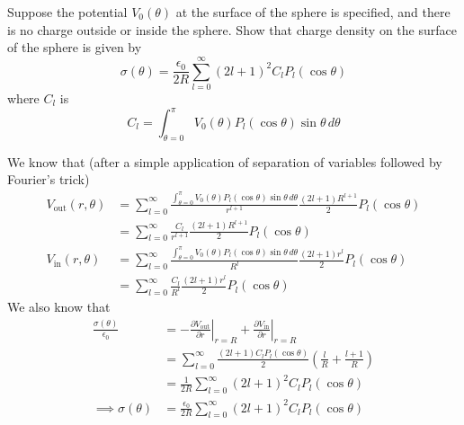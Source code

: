 \documentclass[../main.tex]{subfiles}
\begin{document}
\begin{questions}
	\question Suppose the potential $V_0(\theta)$ at the surface of the sphere is specified, and there is no charge outside or inside the sphere. Show that charge density on the surface of the sphere is given by
	\begin{equation*}
		\sigma(\theta) = \frac{\epsilon_0}{2R}\sum_{l=0}^{\infty} (2l+1)^2 C_l P_l(\cos\theta)
	\end{equation*}
	where $C_l$ is
	\begin{equation*}
		C_l = \int_{\theta=0}^{\pi} V_0(\theta)P_l(\cos\theta)\sin\theta\,d\theta
	\end{equation*}
	\begin{solution}
		We know that (after a simple application of separation of variables followed by Fourier's trick)
		\begin{align}
			V_\text{out}(r,\theta) &= \sum_{l=0}^{\infty} \frac{\int_{\theta=0}^{\pi}V_0(\theta)P_l(\cos\theta)\sin\theta\,d\theta}{r^{l+1}}\frac{(2l+1)R^{l+1}}{2}P_l(\cos\theta)\\
			&=  \sum_{l=0}^{\infty} \frac{C_l}{r^{l+1}}\frac{(2l+1)R^{l+1}}{2}P_l(\cos\theta)\\
			V_\text{in}(r,\theta) &= \sum_{l=0}^{\infty} \frac{\int_{\theta=0}^{\pi}V_0(\theta)P_l(\cos\theta)\sin\theta\,d\theta}{R^l}\frac{(2l+1)r^l}{2}P_l(\cos\theta)\\
			&= \sum_{l=0}^{\infty} \frac{C_l}{R^l}\frac{(2l+1)r^l}{2}P_l(\cos\theta)
		\end{align}
		We also know that
		\begin{align}
			\frac{\sigma(\theta)}{\epsilon_0} &= \left.-\frac{\partial V_\text{out}}{\partial r}\right|_{r=R} + \left.\frac{\partial V_\text{in}}{\partial r}\right|_{r=R}\\
			&= \sum_{l=0}^{\infty} \frac{(2l+1)C_lP_l(\cos\theta)}{2}\left(\frac{l}{R}+\frac{l+1}{R}\right)\\
			&= \frac{1}{2R}\sum_{l=0}^{\infty} (2l+1)^2 C_l P_l(\cos\theta)\\
			\implies \sigma(\theta) &= \frac{\epsilon_0}{2R}\sum_{l=0}^{\infty} (2l+1)^2 C_l P_l(\cos\theta)
		\end{align}
	\end{solution}
\end{questions}
\end{document}
